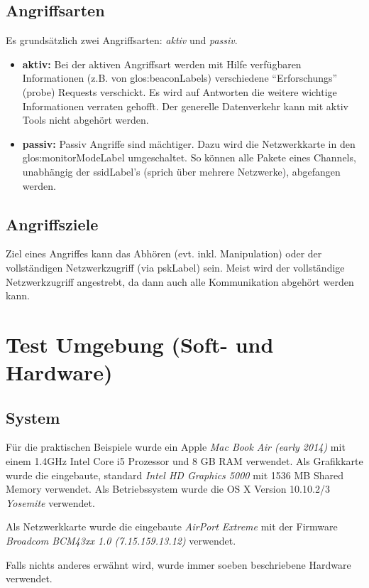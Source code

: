 \subsection{Angriffsarten}
Es grundsätzlich zwei Angriffsarten: \textit{aktiv} und \textit{passiv}.
\begin{itemize}
	\item \textbf{aktiv:}
	Bei der aktiven Angriffsart werden mit Hilfe verfügbaren Informationen (z.B. von \glspl{glos:beaconLabel}) verschiedene "`Erforschungs"' (probe) Requests verschickt.
	Es wird auf Antworten die weitere wichtige Informationen verraten gehofft.
	Der generelle Datenverkehr kann mit aktiv Tools nicht abgehört werden.

	\item \textbf{passiv:}
	Passiv Angriffe sind mächtiger. Dazu wird die Netzwerkkarte in den \gls{glos:monitorModeLabel} umgeschaltet.
	So können alle Pakete eines Channels, unabhängig der \gls{ssidLabel}'s (sprich über mehrere Netzwerke), abgefangen werden.

\end{itemize}

\subsection{Angriffsziele}
Ziel eines Angriffes kann das Abhören (evt. inkl. Manipulation) oder der vollständigen Netzwerkzugriff (via \gls{pskLabel}) sein.
Meist wird der vollständige Netzwerkzugriff angestrebt, da dann auch alle Kommunikation abgehört werden kann.

\section{Test Umgebung (Soft- und Hardware)}
\label{sec:testEnvroiment}
\subsection{System}
Für die praktischen Beispiele wurde ein Apple \textit{Mac Book Air (early 2014)} mit einem 1.4GHz Intel Core i5 Prozessor und 8 GB RAM verwendet. Als Grafikkarte wurde die eingebaute, standard \textit{Intel HD Graphics 5000} mit 1536 MB Shared Memory verwendet.
Als Betriebssystem wurde die OS X Version 10.10.2/3 \textit{Yosemite} verwendet.

Als Netzwerkkarte wurde die eingebaute \textit{AirPort Extreme} mit der Firmware \textit{Broadcom BCM43xx 1.0 (7.15.159.13.12)} verwendet.

Falls nichts anderes erwähnt wird, wurde immer soeben beschriebene Hardware verwendet.
